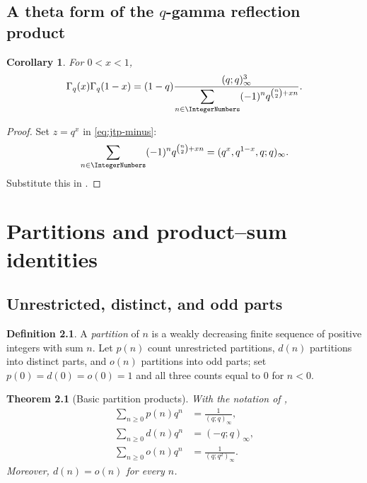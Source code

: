 \documentclass[11pt,a4paper,oneside,openany]{book}
\newtheorem{theorem}{Theorem}[chapter]
\newtheorem{corollary}[corollary]{Corollary}
\theoremstyle{definition}
\newtheorem{definition}[definition]{Definition}
\theoremstyle{remark}
\begin{document}
\section{A theta form of the \texorpdfstring{$q$}{q}-gamma reflection product}

\begin{corollary}\label{cor:qgamma-theta}
For $0<x<1$,
\[
 \Gamma_q(x)\Gamma_q(1-x)
 =(1-q)\frac{(q;q)_\infty^3}
 {\displaystyle\sum_{n\in\IntegerNumbers}(-1)^n
 q^{\binom n2+xn}}.
\]
\end{corollary}

\begin{proof}
Set $z=q^x$ in \eqref{eq:jtp-minus}:
\[
 \sum_{n\in\IntegerNumbers}(-1)^nq^{\binom n2+xn}
 =(q^x,q^{1-x},q;q)_\infty.
\]
Substitute this in .
\end{proof}



\chapter{Partitions and product--sum identities}\label{chap:partitions}

\section{Unrestricted, distinct, and odd parts}

\begin{definition}\label{qg:def-partition}
A \emph{partition} of $n$ is a weakly decreasing finite sequence of positive
integers with sum $n$.  Let $p(n)$ count unrestricted partitions,
$d(n)$ partitions into distinct parts, and $o(n)$ partitions into odd parts;
set $p(0)=d(0)=o(0)=1$ and all three counts equal to $0$ for $n<0$.
\end{definition}

\begin{theorem}[Basic partition products]\label{thm:partition-products}
With the notation of ,
\begin{align*}
 \sum_{n\ge0}p(n)q^n&=\frac1{(q;q)_\infty},\\
 \sum_{n\ge0}d(n)q^n&=(-q;q)_\infty,\\
 \sum_{n\ge0}o(n)q^n&=\frac1{(q;q^2)_\infty}.
\end{align*}
Moreover, $d(n)=o(n)$ for every $n$.
\end{theorem}
\end{document}
